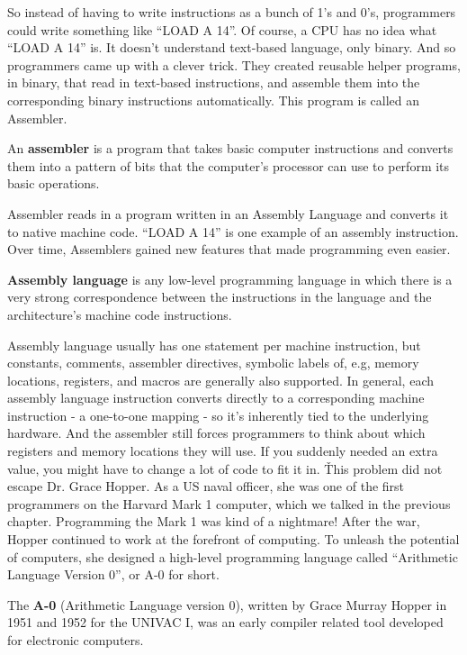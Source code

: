 So instead of having to write instructions as a bunch of 1's and 0's, programmers could write something like ``LOAD A
14''. Of course, a CPU has no idea what ``LOAD A 14'' is. It doesn't understand text-based language, only binary. And
so programmers came up with a clever trick. They created reusable helper programs, in binary, that read in text-based
instructions, and assemble them into the corresponding binary instructions automatically. This program is called an
Assembler.

\bd[Assembler]
An \textbf{assembler} is a program that takes basic computer instructions and converts them into a pattern of bits
that the computer's processor can use to perform its basic operations.
\ed

Assembler reads in a program written in an Assembly Language and converts it to native machine code. ``LOAD A 14'' is
one example of an assembly instruction. Over time, Assemblers gained new features that made programming even easier.

\textbf{Assembly language} is any low-level programming language in which there is a very strong correspondence
between the instructions in the language and the architecture's machine code instructions.
\ed

Assembly language usually has one statement per machine instruction, but constants, comments, assembler directives,
symbolic labels of, e.g, memory locations, registers, and macros are generally also supported. In general, each
assembly language instruction converts directly to a corresponding machine instruction - a one-to-one mapping - so
it's inherently tied to the underlying hardware. And the assembler still forces programmers to think about which
registers and memory locations they will use. If you suddenly needed an extra value, you might have to change a lot
of code to fit it in. \v

This problem did not escape Dr. Grace Hopper. As a US naval officer, she was one of the first programmers on the
Harvard Mark 1 computer, which we talked in the previous chapter. Programming the Mark 1 was kind of a nightmare!
After the war, Hopper continued to work at the forefront of computing. To unleash the potential of computers, she
designed a high-level programming language called ``Arithmetic Language Version 0'', or A-0 for short.

\bd[A-0]
The \textbf{A-0} (Arithmetic Language version 0), written by Grace Murray Hopper in 1951 and 1952 for the UNIVAC I,
was an early compiler related tool developed for electronic computers.
\ed

